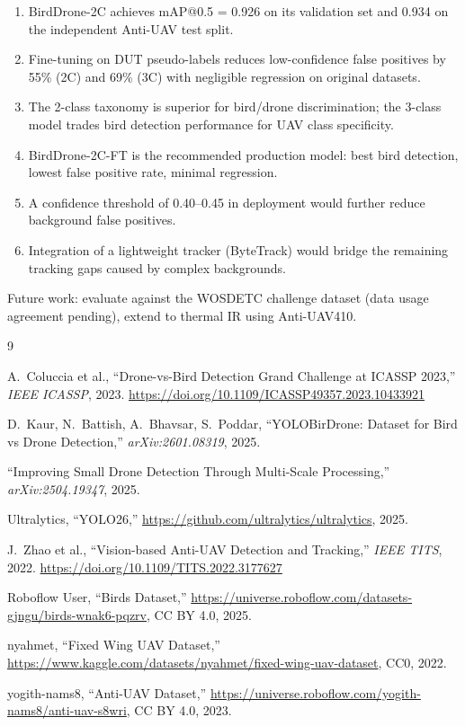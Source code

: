 \documentclass[11pt]{article}
\begin{document}
\begin{enumerate}
  \item BirdDrone-2C achieves mAP@0.5 = 0.926 on its validation set and
        0.934 on the independent Anti-UAV test split.
  \item Fine-tuning on DUT pseudo-labels reduces low-confidence false positives
        by 55\% (2C) and 69\% (3C) with negligible regression on original datasets.
  \item The 2-class taxonomy is superior for bird/drone discrimination;
        the 3-class model trades bird detection performance for UAV class specificity.
  \item BirdDrone-2C-FT is the recommended production model: best bird detection,
        lowest false positive rate, minimal regression.
  \item A confidence threshold of 0.40--0.45 in deployment would further reduce
        background false positives.
  \item Integration of a lightweight tracker (ByteTrack) would bridge the
        remaining tracking gaps caused by complex backgrounds.
\end{enumerate}

Future work: evaluate against the WOSDETC challenge dataset (data usage
agreement pending), extend to thermal IR using Anti-UAV410.

\begin{thebibliography}{9}

A.\ Coluccia et al.,
``Drone-vs-Bird Detection Grand Challenge at ICASSP 2023,''
\textit{IEEE ICASSP}, 2023.
\url{https://doi.org/10.1109/ICASSP49357.2023.10433921}

D.\ Kaur, N.\ Battish, A.\ Bhavsar, S.\ Poddar,
``YOLOBirDrone: Dataset for Bird vs Drone Detection,''
\textit{arXiv:2601.08319}, 2025.

``Improving Small Drone Detection Through Multi-Scale Processing,''
\textit{arXiv:2504.19347}, 2025.

Ultralytics, ``YOLO26,''
\url{https://github.com/ultralytics/ultralytics}, 2025.

J.\ Zhao et al.,
``Vision-based Anti-UAV Detection and Tracking,''
\textit{IEEE TITS}, 2022.
\url{https://doi.org/10.1109/TITS.2022.3177627}

Roboflow User, ``Birds Dataset,''
\url{https://universe.roboflow.com/datasets-gjngu/birds-wnak6-pqzrv},
CC BY 4.0, 2025.

nyahmet, ``Fixed Wing UAV Dataset,''
\url{https://www.kaggle.com/datasets/nyahmet/fixed-wing-uav-dataset},
CC0, 2022.

yogith-nams8, ``Anti-UAV Dataset,''
\url{https://universe.roboflow.com/yogith-nams8/anti-uav-s8wri},
CC BY 4.0, 2023.

\end{thebibliography}
\end{document}
